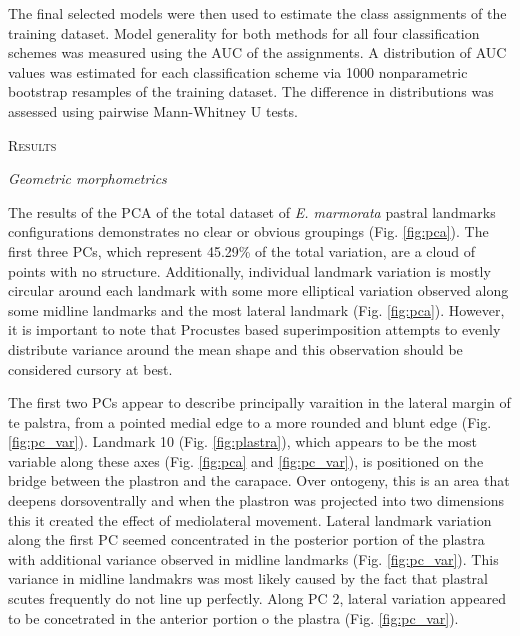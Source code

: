 \documentclass[12pt,letterpaper]{article}\usepackage{graphicx, color}
\renewcommand{\section}[1]{%
\bigskip
\begin{center}
\begin{Large}
\normalfont\scshape #1
\medskip
\end{Large}
\end{center}}
\renewcommand{\subsection}[1]{%
\bigskip
\begin{center}
\begin{large}
\normalfont\itshape #1
\end{large}
\end{center}}
\begin{document}
The final selected models were then used to estimate the class assignments of the training dataset. Model generality for both methods for all four classification schemes was measured using the AUC of the assignments. A distribution of AUC values was estimated for each classification scheme via 1000 nonparametric bootstrap resamples of the training dataset. The difference in distributions was assessed using pairwise Mann-Whitney U tests.

\section{Results}
\subsection{Geometric morphometrics}
The results of the PCA of the total dataset of \textit{E. marmorata} pastral landmarks configurations demonstrates no clear or obvious groupings (Fig. \ref{fig:pca}). The first three PCs, which represent 45.29\% of the total variation, are a cloud of points with no structure. Additionally, individual landmark variation is mostly circular around each landmark with some more elliptical variation observed along some midline landmarks and the most lateral landmark (Fig. \ref{fig:pca}). However, it is important to note that Procustes based superimposition attempts to evenly distribute variance around the mean shape \citep{Zelditch2004} and this observation should be considered cursory at best.

The first two PCs appear to describe principally varaition in the lateral margin of te palstra, from a pointed medial edge to a more rounded and blunt edge (Fig. \ref{fig:pc_var}). Landmark 10 (Fig. \ref{fig:plastra}), which appears to be the most variable along these axes (Fig. \ref{fig:pca} and \ref{fig:pc_var}), is positioned on the bridge between the plastron and the carapace. Over ontogeny, this is an area that deepens dorsoventrally and when the plastron was projected into two dimensions this it created the effect of mediolateral movement.
Lateral landmark variation along the first PC seemed concentrated in the posterior portion of the plastra with additional variance observed in midline landmarks (Fig. \ref{fig:pc_var}). This variance in midline landmakrs was most likely caused by the fact that plastral scutes frequently do not line up perfectly. Along PC 2, lateral variation appeared to be concetrated in the anterior portion o the plastra (Fig. \ref{fig:pc_var}).
\end{document}
